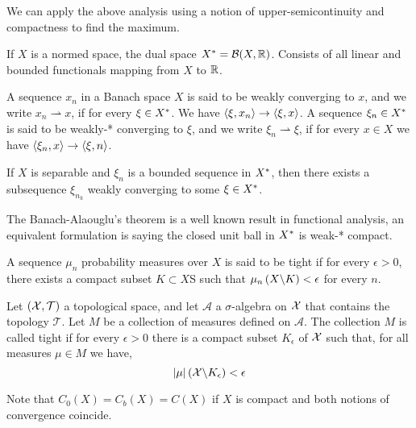 We can apply the above analysis using a notion of upper-semicontinuity and compactness to find the maximum.

\begin{definition}
	If $X$ is a normed space, the dual space ${X}^*=\mathcal B(X, \mathbb{R})$. Consists of all linear and bounded functionals mapping from $X$ to $\mathbb{R}$.
\end{definition}

\begin{definition}
	A sequence $x_n$ in a Banach space $X$ is said to be weakly converging to $x$, and we write $x_n \rightharpoonup x$, if for every $\xi \in {X}^*$. We have $\left\langle \xi, x_n \right\rangle\rightarrow \left\langle \xi, x \right\rangle$. A sequence $\xi_n \in {X}^*$ is said to be weakly-* converging to $\xi$, and we write $\xi_n \rightharpoonup \xi$, if for every $x\in X$ we have $\left\langle \xi_n, x \right\rangle \rightarrow \left\langle \xi, n \right\rangle$.
\end{definition}

\begin{theorem}
	If $X$ is separable and $\xi_n$ is a bounded sequence in ${X}^*$, then there exists a subsequence $\xi_{n_k}$ weakly converging to some $\xi \in {X}^*$.
\end{theorem}
The Banach-Alaouglu's theorem is a well known result in functional analysis, an equivalent formulation is saying the closed unit ball in ${X}^*$ is weak-* compact.

\begin{definition}
	A sequence $\mu_n$ probability measures over $X$ is said to be tight if for every
	$\epsilon> 0$, there exists a compact subset $K\subset X$S such that $\mu_n\left( X\backslash K \right)< \epsilon$ for every $n$.
\end{definition}

\begin{definition}[Tightness] Let $(\mathcal{X}, \mathcal T)$ a topological space, and let $\mathcal A$ a $\sigma$-algebra on $\mathcal{X}$ that contains the topology $\mathcal{T}$. Let $M$ be a collection of measures defined on $\mathcal{A}$. The collection $M$ is called tight  if for every $\epsilon>0$ there is a compact subset $K_\epsilon$  of $\mathcal{X}$ such that, for all measures $\mu\in M$ we have,
	\begin{equation*}
		\left| \mu \right|\left( \mathcal{X} \backslash K_\epsilon \right) < \epsilon
	\end{equation*} 
\end{definition}
Note that $C_0(X)=C_b(X)=C(X)$ if $X$ is compact and both notions of convergence coincide.

